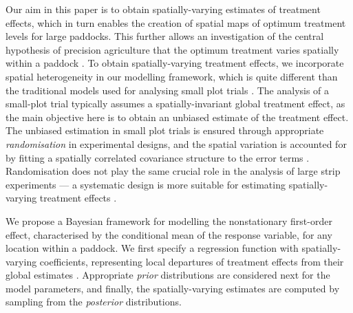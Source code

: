 \documentclass[a4paper]{article}   	%
\begin{document}
	
	Our aim in this paper is to obtain spatially-varying estimates of treatment effects, which in turn enables the creation of spatial maps of optimum treatment levels for large paddocks. This further allows an investigation of the central hypothesis of precision agriculture that the optimum treatment  varies spatially within a paddock \parencite{Paez2002General, Brunsdon1999Notes, Lark2003Methoda, Pringle2010Analysis}. To obtain spatially-varying treatment effects, we incorporate spatial heterogeneity in our modelling framework, which is quite different than the traditional models used for analysing small plot trials \parencite{Rakshit2020Novel, Piepho2011Statistical}. The analysis of a small-plot trial typically assumes a spatially-invariant global treatment effect, as the main objective here is to obtain an unbiased estimate of the treatment effect. The unbiased estimation in small plot trials is ensured through appropriate \emph{randomisation} in experimental designs, and the spatial variation is accounted for by fitting a spatially correlated covariance structure to the error terms \parencite{Gilmour1997Accounting, Stefanova2009Enhanced}. Randomisation does not play the same crucial role in the analysis of large strip experiments --- a systematic design is more suitable for estimating spatially-varying treatment effects \parencite{Rakshit2020Novel, Piepho2011Statistical, Evans2020Assessment}. 
	
	
	We propose a Bayesian framework for modelling the nonstationary first-order effect, characterised by the conditional mean of the response variable, for any location within a paddock. We first specify a regression function with spatially-varying coefficients, representing local departures of treatment effects from their global estimates \parencite{Banerjee2004Hierarchical}. Appropriate \emph{prior} distributions are considered next for the model parameters, and finally, the spatially-varying estimates are computed by sampling from the \emph{posterior} distributions. 
	
\end{document}
